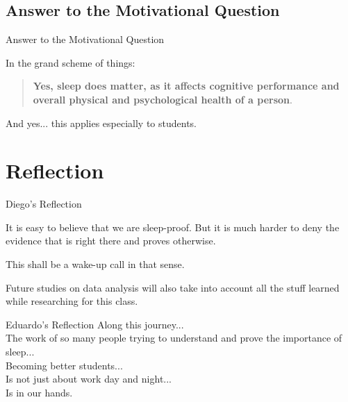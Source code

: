 \documentclass{beamer}
\begin{document}
\subsection{Answer to the Motivational Question}

\begin{frame}{Answer to the Motivational Question}

In the grand scheme of things:

\begin{quotation}
    \textbf{Yes, sleep does matter, as it affects cognitive performance and overall physical and psychological health of a person}. \\
\end{quotation}

\bigskip
    
And yes... this applies especially to students.    
    
\end{frame}

\section{Reflection}

\begin{frame}{Diego's Reflection}

It is easy to believe that we are sleep-proof. But it is much harder to deny the evidence that is right there and proves otherwise. \\ 

\bigskip 

This shall be a wake-up call in that sense. \\

\bigskip

Future studies on data analysis will also take into account all the stuff learned while researching for this class. 

\end{frame}

\begin{frame}{Eduardo's Reflection}
    Along this journey...\\
    \bigskip
    The work of so many people trying to understand and prove the importance of sleep...\\
    \bigskip
    Becoming better students...\\
    \bigskip
    Is not just about work day and night... \\
    \bigskip
    Is in our hands.\\
    
\end{frame}
\end{document}
